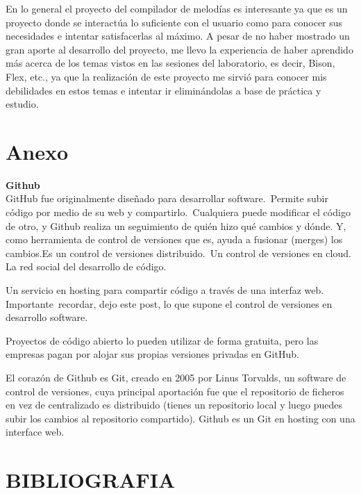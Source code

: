 \documentclass[12pt]{article}
\begin{document}
En lo general el proyecto del compilador de melodías es interesante ya que es un proyecto donde se interactúa lo suficiente con el usuario como para conocer sus necesidades e intentar satisfacerlas al máximo. A pesar de no haber mostrado un gran aporte al desarrollo del proyecto, me llevo la experiencia de haber aprendido más  acerca de los temas vistos en las sesiones del laboratorio, es decir, Bison, Flex, etc., ya que la realización de este proyecto me sirvió para conocer mis debilidades en estos temas e intentar ir eliminándolas a base de práctica y estudio.\\


\section{Anexo}
{\bf Github}\\
GitHub fue originalmente diseñado para desarrollar software. Permite subir código por medio de su web y compartirlo. Cualquiera puede modificar el código de otro, y Github realiza un seguimiento de quién hizo qué cambios y dónde. Y, como herramienta de control de versiones que es, ayuda a fusionar (merges) los cambios.Es un control de versiones distribuido. Un control de versiones en cloud. La red social del desarrollo de código.

Un servicio en hosting para compartir código a través de una interfaz web. Importante recordar, dejo este post, lo que supone el control de versiones en desarrollo software.

Proyectos de código abierto lo pueden utilizar de forma gratuita, pero las empresas pagan por alojar sus propias versiones privadas en GitHub.

El corazón de Github es Git, creado en 2005 por Linus Torvalds, un software de control de versiones, cuya principal aportación fue que el repositorio de ficheros en vez de centralizado es distribuido (tienes un repositorio local y luego puedes subir los cambios al repositorio compartido). Github es un Git en hosting con una interface web.\\


\section{BIBLIOGRAFIA}
\end{document}
